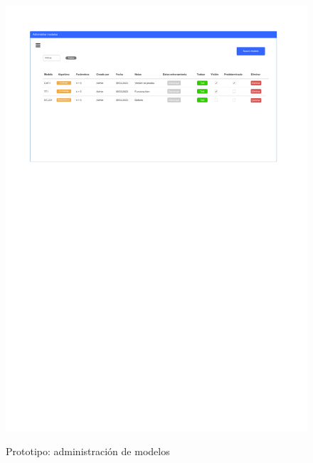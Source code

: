 \begin{figure}[h]
	\caption{Prototipo: administración de modelos}
	\centering
	\includegraphics[width=\textwidth]{../img/anexos/mockups/5-mockups-models}
	\label{mock:model-admin}
\end{figure}

